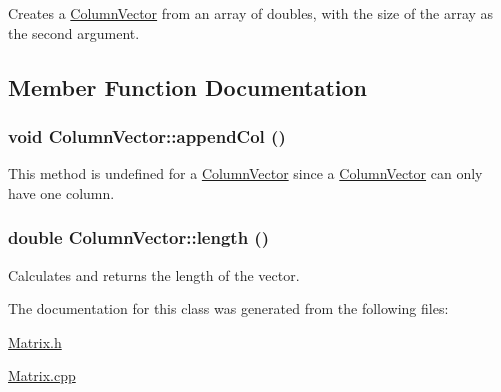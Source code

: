Creates a \hyperlink{class_column_vector}{ColumnVector} from an array of doubles, with the size of the array as the second argument. 



\subsection{Member Function Documentation}
\hypertarget{class_column_vector_a0e67b7831d9d4c02691056a72abc6975}{
\subsubsection[{appendCol}]{\setlength{\rightskip}{0pt plus 5cm}void ColumnVector::appendCol ()}}
\label{class_column_vector_a0e67b7831d9d4c02691056a72abc6975}


This method is undefined for a \hyperlink{class_column_vector}{ColumnVector} since a \hyperlink{class_column_vector}{ColumnVector} can only have one column. 

\hypertarget{class_column_vector_a66329a870ee70b5cd93879d3be247b21}{
\subsubsection[{length}]{\setlength{\rightskip}{0pt plus 5cm}double ColumnVector::length ()}}
\label{class_column_vector_a66329a870ee70b5cd93879d3be247b21}


Calculates and returns the length of the vector. 



The documentation for this class was generated from the following files:\begin{DoxyCompactItemize}
\item 
\hyperlink{_matrix_8h}{Matrix.h}\item 
\hyperlink{_matrix_8cpp}{Matrix.cpp}\end{DoxyCompactItemize}
